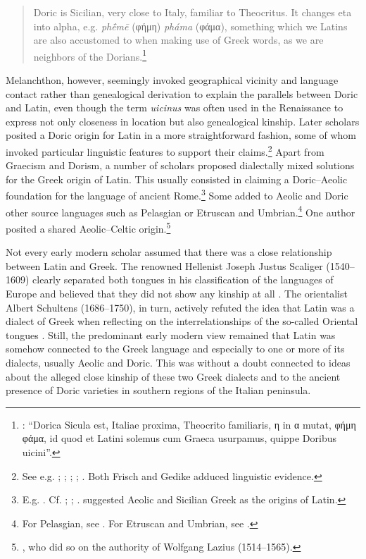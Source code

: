 \begin{quote}
Doric is Sicilian, very close to Italy, familiar to Theocritus. It changes eta into alpha, e.g. \textit{phḗmē} (φήμη) \textit{pháma} (φάμα), something which we Latins are also accustomed to when making use of Greek words, as we are neighbors of the Dorians.\footnote{\citet[a.i\textsc{\textsuperscript{v}}]{Melanchthon1518}: “Dorica Sicula est, Italiae proxima, Theocrito familiaris, η in α mutat, φήμη φάμα, id quod et Latini solemus cum Graeca usurpamus, quippe Doribus uicini”.}
\end{quote}

Melanchthon, however, seemingly invoked geographical vicinity and language contact rather than genealogical derivation to explain the parallels between Doric and Latin, even though the term \textit{uicinus} was often used in the Renaissance to express not only closeness in location but also genealogical kinship. Later scholars posited a Doric origin for Latin in a more straightforward fashion, some of whom invoked particular linguistic features to support their claims.\footnote{See e.g. \citet[10]{Sylvius1531}; \citet[\textsc{i.}14]{Estienne1572}; \citet[208]{Merula1605}; \citet[1191]{[frisch]1730}; \citet[20--21]{Gedike1782}. Both Frisch and Gedike adduced linguistic evidence.} Apart from Graecism and Dorism, a number of scholars proposed dialectally mixed solutions for the Greek origin of Latin. This usually consisted in claiming a Doric–Aeolic foundation for the language of ancient Rome.\footnote{E.g. \citet[11--12]{Anon.1613}. Cf. \citet[304--305]{Verwey1684}; \citet[a.2\textsc{\textsuperscript{v}}, 159]{Maittaire1706}; \citet[161]{Gesner1774}. \citet[270, 379]{Casaubon1650} suggested Aeolic and Sicilian Greek as the origins of Latin.} Some added to Aeolic and Doric other source languages such as Pelasgian or Etruscan and Umbrian.\footnote{For Pelasgian, see \citet[a.4\textsc{\textsuperscript{r}}]{Canini1555}. For Etruscan and Umbrian, see \citet[39]{Rudiger1782}.} One author posited a shared Aeolic–Celtic origin.\footnote{\citet[13]{Nicolson1715}, who did so on the authority of Wolfgang Lazius (1514–1565).}

Not every early modern scholar assumed that there was a close relationship between Latin and Greek. The renowned Hellenist Joseph Justus Scaliger (1540–1609) clearly separated both tongues in his classification of the languages of Europe and believed that they did not show any kinship at all \citep{Scaliger1610}. The orientalist Albert Schultens (1686–1750), in turn, actively refuted the idea that Latin was a dialect of Greek when reflecting on the interrelationships of the so-called Oriental tongues \citep[109]{Schultens1738b}. Still, the predominant early modern view remained that Latin was somehow connected to the Greek language and especially to one or more of its dialects, usually Aeolic and Doric. This was without a doubt connected to ideas about the alleged close kinship of these two Greek dialects and to the ancient presence of Doric varieties in southern regions of the Italian peninsula.

